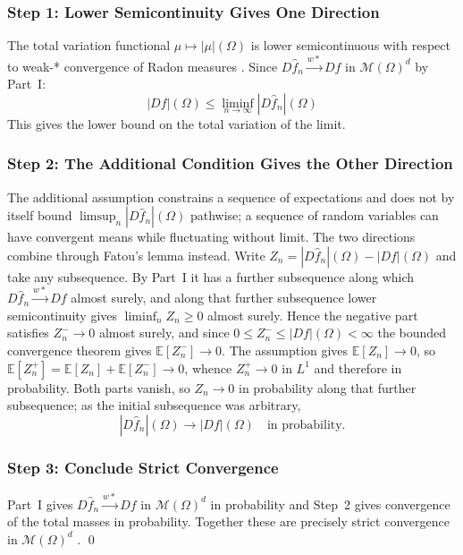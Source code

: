 \documentclass[12pt,a4paper]{article}
\numberwithin{equation}{section}
\theoremstyle{plain}
\theoremstyle{definition}
\newcommand{\E}{\mathbb{E}}
\newcommand{\cM}{\mathcal{M}(\Omega)^d}
\newcommand{\fn}{\hat{f}_n}
\begin{document}
	\subsubsection*{Step 1: Lower Semicontinuity Gives One Direction}
	
	The total variation functional $\mu \mapsto |\mu|(\Omega)$ is lower
	semicontinuous with respect to weak-* convergence of Radon measures
	\citep[Theorem~5.2]{evans2015measure}. Since $D\fn \xrightarrow{w*} Df$
	in $\cM$ by Part~I:
	\begin{equation}
		|Df|(\Omega) \leq \liminf_{n \to \infty} |D\fn|(\Omega)
	\end{equation}
	This gives the lower bound on the total variation of the limit.
	
	\subsubsection*{Step 2: The Additional Condition Gives the Other Direction}

	The additional assumption constrains a sequence of expectations and does not
	by itself bound $\limsup_n |D\fn|(\Omega)$ pathwise; a sequence of random
	variables can have convergent means while fluctuating without limit. The two
	directions combine through Fatou's lemma instead. Write
	$Z_n = |D\fn|(\Omega) - |Df|(\Omega)$ and take any subsequence. By Part~I it
	has a further subsequence along which $D\fn \xrightarrow{w*} Df$ almost
	surely, and along that further subsequence lower semicontinuity gives
	$\liminf_n Z_n \geq 0$ almost surely. Hence the negative part satisfies
	$Z_n^- \to 0$ almost surely, and since $0 \leq Z_n^- \leq |Df|(\Omega)
	< \infty$ the bounded convergence theorem gives $\E[Z_n^-] \to 0$. The
	assumption gives $\E[Z_n] \to 0$, so
	$\E[Z_n^+] = \E[Z_n] + \E[Z_n^-] \to 0$, whence $Z_n^+ \to 0$ in $L^1$ and
	therefore in probability. Both parts vanish, so $Z_n \to 0$ in probability
	along that further subsequence; as the initial subsequence was arbitrary,
	\begin{equation}
		|D\fn|(\Omega) \longrightarrow |Df|(\Omega) \quad \text{in probability.}
	\end{equation}

	\subsubsection*{Step 3: Conclude Strict Convergence}

	Part~I gives $D\fn \xrightarrow{w*} Df$ in $\cM$ in probability and Step~2
	gives convergence of the total masses in probability. Together these are
	precisely strict convergence in $\cM$
	\citep[Definition~3.13]{ambrosio2000bv}. \qed
\end{document}
